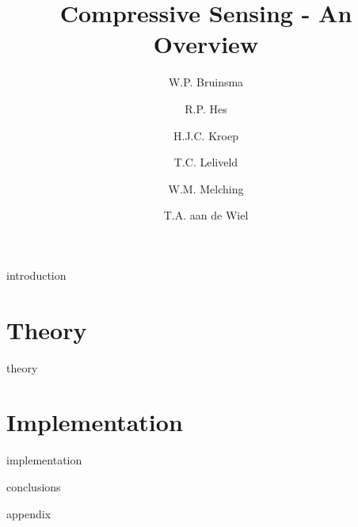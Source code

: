 \documentclass[a4paper, openany, oneside]{memoir}
\title{Compressive Sensing - An Overview}
\author{W.P. Bruinsma \and R.P. Hes \and H.J.C. Kroep \and T.C. Leliveld \and W.M. Melching \and T.A. aan de Wiel}
\begin{document}
\frontmatter

\begin{titlingpage}
  \pagestyle{empty}
  \maketitle
\end{titlingpage}


\tableofcontents

\mainmatter
{introduction}

\part{Theory}
{theory}
\part{Implementation}
{implementation}

{conclusions}

{}
\printbibliography

{appendix}
\end{document}
